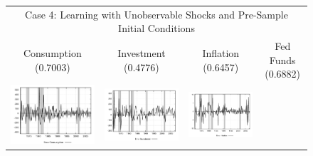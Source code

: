 \begin{figure}
\begin{tabular}{cccc}
\multicolumn{4}{c}{Case 4: Learning with Unobservable Shocks and Pre-Sample Initial Conditions} \\ 
Consumption (0.7003) & Investment (0.4776) & Inflation (0.6457) & Fed Funds (0.6882) \\
\includegraphics[scale=0.22]{results_wlsinit/consumption_err.png} & 
\includegraphics[scale=0.22]{results_wlsinit/investment_err.png} & 
\includegraphics[scale=0.22]{results_wlsinit/inflation_err.png} & 

\end{tabular}
\end{figure}

